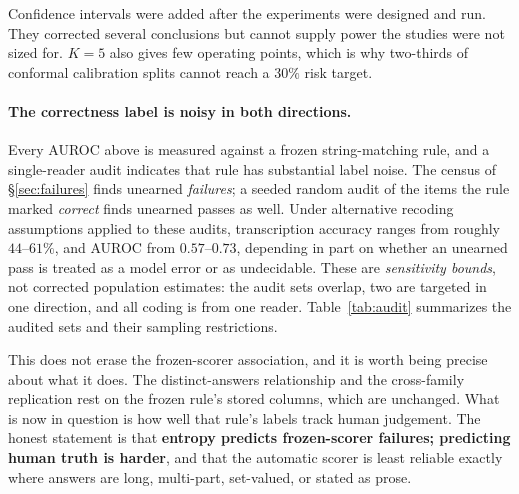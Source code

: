 \documentclass[10pt,twocolumn,letterpaper]{article}
\begin{document}
Confidence intervals were added after the experiments were designed and
run. They corrected several conclusions but cannot supply power the
studies were not sized for. $K=5$ also gives few operating points, which
is why two-thirds of conformal calibration splits cannot reach a $30\%$
risk target.

\paragraph{The correctness label is noisy in both directions.}
Every AUROC above is measured against a frozen string-matching rule, and a
single-reader audit indicates that rule has substantial label noise. The census of
\S\ref{sec:failures} finds unearned \emph{failures}; a seeded random
audit of the items the rule marked \emph{correct} finds unearned passes
as well. Under alternative recoding assumptions applied to these audits,
transcription accuracy ranges from roughly $44$--$61\%$, and AUROC from
$0.57$--$0.73$, depending in part on whether an unearned pass is treated as
a model error or as undecidable. These are \emph{sensitivity bounds}, not
corrected population estimates: the audit sets overlap, two are targeted in
one direction, and all coding is from one reader. Table~\ref{tab:audit}
summarizes the audited sets and their sampling restrictions.

This does not erase the frozen-scorer association, and it is worth being
precise about what it does. The distinct-answers relationship and the
cross-family replication rest on the frozen rule's stored columns, which
are unchanged. What is now in question is how well that rule's labels
track human judgement. The honest statement is that \textbf{entropy
predicts frozen-scorer failures; predicting human truth is harder}, and
that the automatic scorer is least reliable exactly where answers are
long, multi-part, set-valued, or stated as prose.
\end{document}
